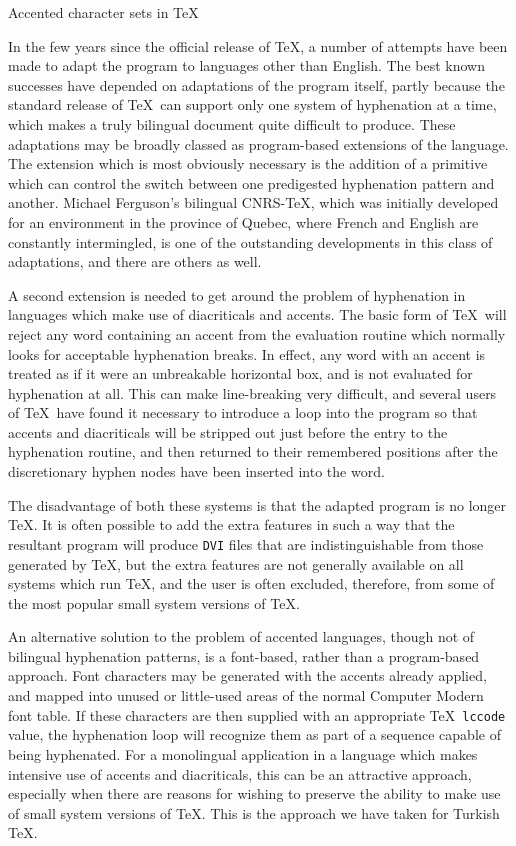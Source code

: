 \medskip
\centerline{{\elevenrm Accented character sets in \TeX}}
\smallskip

\noindent
In the few years since 
the official release of \TeX, a number of
attempts have been made to adapt the program to languages other than
English.  The best known successes have depended on adaptations of the
program itself, partly because the standard release of \TeX\ can
support only one system of hyphenation at a time, which makes a truly
bilingual document quite difficult to produce.  These adaptations may
be broadly classed as program-based extensions of the language.  The
extension which is most obviously necessary is the addition of a
primitive which can control the switch between one predigested
hyphenation pattern and another.  Michael Ferguson's bilingual CNRS-\TeX,
which was initially developed for an environment in the province of
Quebec, where French and English are constantly intermingled, is one
of the outstanding developments in this class of adaptations, and
there are others as well.

A second extension is needed to get around the problem of hyphenation
in languages which make use of diacriticals and accents.  The basic
form of \TeX\ will reject any word containing an accent from the
evaluation routine
which normally looks for acceptable hyphenation breaks.  In effect,
any word with an accent is treated as if it were an unbreakable
horizontal box, and is not evaluated for hyphenation at all.  This can
make line-breaking very difficult, and several users of \TeX\ have
found it necessary to introduce a loop into the program so that
accents and diacriticals will be stripped out just before the entry to
the hyphenation routine, and then returned to their remembered positions
after the discretionary hyphen nodes have been inserted into the word.

The disadvantage of both these systems is that the adapted program is no
longer \TeX.  It is often possible to add the extra features in such a way 
that the resultant program will produce {\tt DVI} files that are
indistinguishable from those generated by \TeX, but the extra features
are not generally available on all systems which run \TeX, and the
user is often excluded, therefore, from some of the most popular small
system versions of \TeX.

An alternative solution to the problem of accented languages, though
not of bilingual hyphenation patterns, is a font-based, rather than a
program-based approach.  Font characters may be generated with the
accents already applied, and mapped into unused or little-used areas
of the normal Computer Modern font table.  If these characters are
then supplied with an appropriate \TeX\ {\tt\bs lccode} value, the
hyphenation loop will recognize them as part of a sequence capable of
being hyphenated.  For a monolingual application in a language which
makes intensive use of accents and diacriticals, this can be an
attractive approach, especially when there are reasons for wishing to
preserve the ability to make use of small system versions of \TeX.  
This is the approach we have taken for Turkish \TeX.

